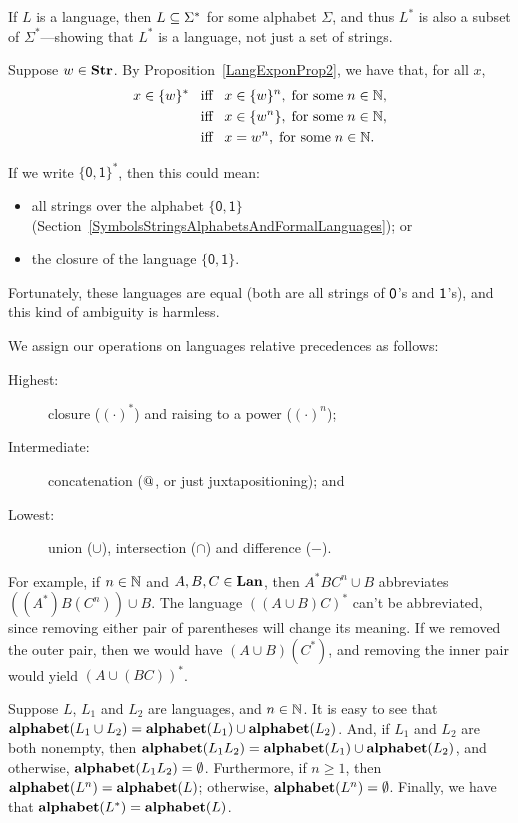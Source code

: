 If $L$ is a language, then $L\subseteq\Sigma^*$ for some alphabet $\Sigma$,
and thus $L^*$ is also a subset of $\Sigma^*$---showing that $L^*$
is a language, not just a set of strings.

Suppose $w\in\mathbf{Str}$.
By Proposition~\ref{LangExponProp2}, we have
that, for all $x$,
\begin{align*}
x\in\{w\}^* &\mathrel{\;\;\allowbreak\mbox{iff}\allowbreak\;\;} x\in\{w\}^n,\;\allowbreak\mbox{for some}\allowbreak\;n\in\mathbb{N} , \\
&\mathrel{\;\;\allowbreak\mbox{iff}\allowbreak\;\;} x\in\{w^n\},\;\allowbreak\mbox{for some}\allowbreak\;n\in\mathbb{N} , \\
&\mathrel{\;\;\allowbreak\mbox{iff}\allowbreak\;\;} x=w^n, \;\allowbreak\mbox{for some}\allowbreak\; n\in\mathbb{N} .
\end{align*}

If we write $\mathsf{\{0,1\}}^*$, then this could mean:
\begin{itemize}
\item
all strings over the alphabet $\mathsf{\{0,1\}}$
(Section~\ref{SymbolsStringsAlphabetsAndFormalLanguages}); or

\item
the closure of the language $\mathsf{\{0,1\}}$.
\end{itemize}
Fortunately, these languages are equal (both are all strings of
$\mathsf{0}$'s and $\mathsf{1}$'s), and this kind of ambiguity is harmless.

%
We assign our operations on languages relative precedences as follows:
\begin{description}
\item[\quad Highest:] closure ($(\cdot)^*$) and raising to a power
($(\cdot)^n$);

\item[\quad Intermediate:] concatenation ($\mathbin{@}$, or just
  juxtapositioning); and

\item[\quad Lowest:] union ($\cup$), intersection ($\cap$) and difference ($-$).
\end{description}
For example, if $n\in\mathbb{N}$ and $A,B,C\in\mathbf{Lan}$, then $A^*BC^n\cup B$
abbreviates $((A^*)B(C^n))\cup B$.  The language $((A\cup B)C)^*$
can't be abbreviated, since removing either pair of parentheses will
change its meaning.  If we removed the outer pair, then we would have
$(A\cup B)(C^*)$, and removing the inner pair would yield $(A\cup
(BC))^*$.

%
%
%
%
Suppose $L$, $L_1$ and $L_2$ are languages, and $n\in\mathbb{N}$.  It
is easy to see that $\mathbf{alphabet}(L_1\cup L_2)=\mathbf{alphabet}(L_1)\cup\mathbf{alphabet}(L_2)$.
And, if $L_1$ and $L_2$ are both nonempty, then
$\mathbf{alphabet}(L_1L_2)=\mathbf{alphabet}(L_1)\cup\mathbf{alphabet}(L_2)$, and otherwise,
$\mathbf{alphabet}(L_1L_2)=\emptyset$.
Furthermore, if $n\geq 1$, then $\mathbf{alphabet}(L^n)=\mathbf{alphabet}(L)$; otherwise,
$\mathbf{alphabet}(L^n)=\emptyset$.
Finally, we have that $\mathbf{alphabet}(L^*)=\mathbf{alphabet}(L)$.

